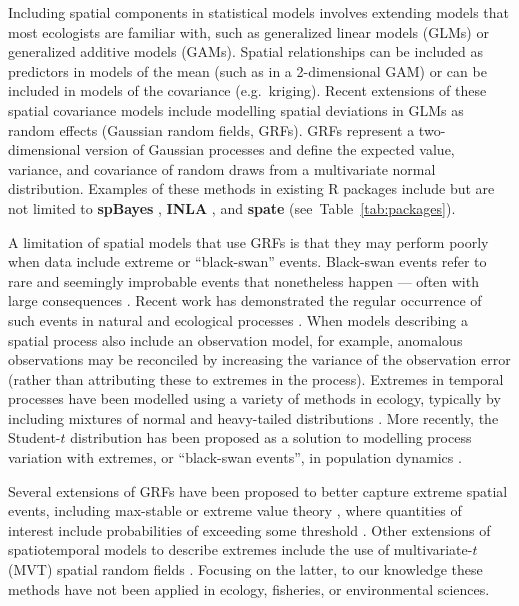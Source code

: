 \documentclass[12pt,english]{article}
\newcommand{\R}[1]{\label{#1}\linelabel{#1}}
\begin{document}
\begin{spacing}{1.8}
Including spatial components in statistical models involves extending models
that most ecologists are familiar with, such as generalized linear
models (GLMs) or generalized additive models (GAMs). Spatial relationships can
be included as predictors in models of the mean (such as in a 2-dimensional GAM)
or can be included in models of the covariance (e.g.\ kriging). Recent
extensions of these spatial covariance models include modelling spatial
deviations in GLMs as random effects (Gaussian random fields, GRFs).
GRFs represent a two-dimensional version of Gaussian
processes and define the expected value, variance, and covariance of
random draws from a multivariate normal distribution.\R{B6}
Examples of these methods in existing R packages include but are not limited to
\textbf{spBayes} \citep{finley2007}, \textbf{INLA} \citep{rue2009}, and
\textbf{spate} \citep{sigrist2015} (see~Table~\ref{tab:packages}).

A limitation of spatial models that use GRFs is that they may perform poorly
when data include extreme or ``black-swan'' events. Black-swan events refer to
rare and seemingly improbable events that nonetheless happen --- often with large
consequences \citep{taleb2007}.
Recent work has demonstrated the regular occurrence of such events in natural
and ecological processes \citep[e.g.][]{albeverio2006, ward2007, fey2015, anderson2017}.\R{B7}
When models describing a spatial process
also include an observation model, for example, anomalous observations may be
reconciled by increasing the variance of the observation error (rather than
attributing these to extremes in the process). Extremes in temporal processes
have been modelled using a variety of methods in ecology, typically by including
mixtures of normal and heavy-tailed distributions \citep[e.g.][]{everitt1996,
  ward2007, thorson2011}. More recently, the Student-$t$ distribution has been
proposed as a solution to modelling process variation with extremes, or
``black-swan events'', in population dynamics \citep{anderson2017}.

Several extensions of GRFs have been proposed to better capture extreme spatial
events, including max-stable or extreme value theory \citep{davison2012,
  davison2012a}, where quantities of interest include probabilities of exceeding
some threshold \citep{davis2008}. Other extensions of spatiotemporal models to
describe extremes include the use of multivariate-$t$ (MVT) spatial random
fields \citep{roislien2007}. Focusing on the latter, to our knowledge these
methods have not been applied in ecology, fisheries, or environmental sciences.


\end{spacing}
\end{document}

